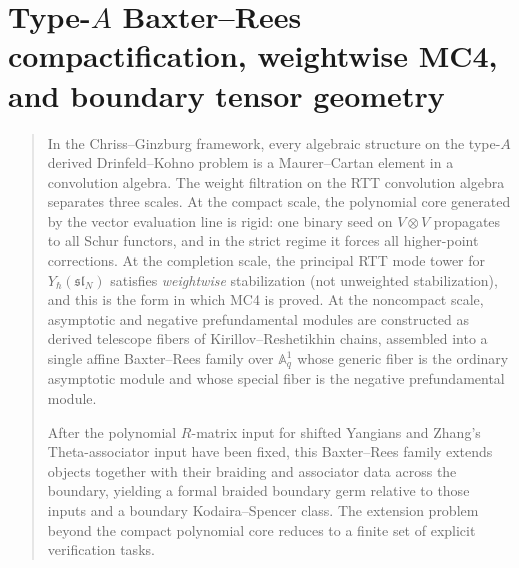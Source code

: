 
\chapter{Type-$A$ Baxter--Rees compactification, weightwise MC4, and boundary tensor geometry}
\label{app:typeA-baxter-rees-theta}

\begin{quote}
In the Chriss--Ginzburg framework, every algebraic structure on the
type-$A$ derived Drinfeld--Kohno problem is a Maurer--Cartan element in a
convolution algebra. The weight filtration on the
RTT convolution algebra separates three scales. At the compact scale, the
polynomial core generated by the vector evaluation line is rigid: one
binary seed on $V\otimes V$ propagates to all Schur functors, and in the
strict regime it forces all higher-point corrections. At the completion
scale, the principal RTT mode tower for $Y_\hbar(\mathfrak{sl}_N)$
satisfies \emph{weightwise} stabilization (not unweighted stabilization),
and this is the form in which MC4 is proved. At the noncompact scale,
asymptotic and negative prefundamental modules are constructed as derived
telescope fibers of Kirillov--Reshetikhin chains, assembled into a single
affine Baxter--Rees family over $\mathbb A^1_q$ whose generic fiber is the
ordinary asymptotic module and whose special fiber is the negative
prefundamental module.

After the polynomial $R$-matrix input for shifted Yangians and Zhang's
Theta-associator input have been fixed, this Baxter--Rees family
extends objects together with their braiding and associator data across
the boundary, yielding a formal braided boundary germ relative to those
inputs and a boundary Kodaira--Spencer class. The extension problem
beyond the compact polynomial core reduces to a finite set of explicit
verification tasks.
\end{quote}

